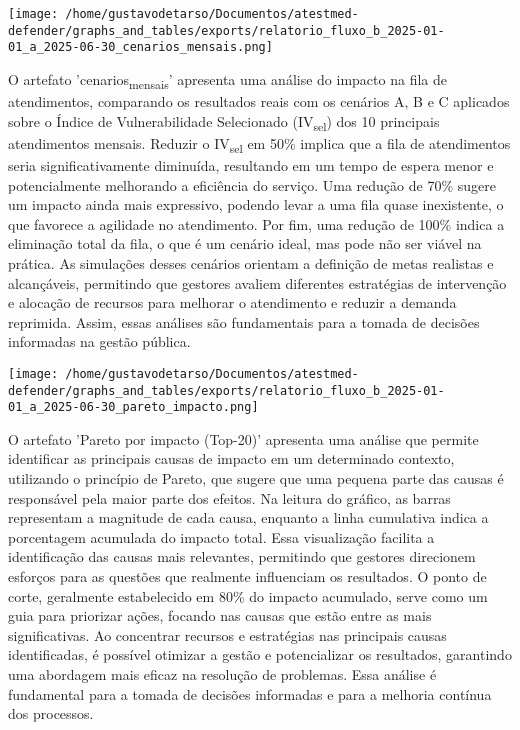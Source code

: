 \documentclass[11pt]{article}
\begin{document}
\begin{center}
\texttt{[image: /home/gustavodetarso/Documentos/atestmed-defender/graphs\_and\_tables/exports/relatorio\_fluxo\_b\_2025-01-01\_a\_2025-06-30\_cenarios\_mensais.png]}
\end{center}
O artefato 'cenarios\textsubscript{mensais}' apresenta uma análise do impacto na fila de atendimentos, comparando os resultados reais com os cenários A, B e C aplicados sobre o Índice de Vulnerabilidade Selecionado (IV\textsubscript{sel}) dos 10 principais atendimentos mensais. Reduzir o IV\textsubscript{sel} em 50\% implica que a fila de atendimentos seria significativamente diminuída, resultando em um tempo de espera menor e potencialmente melhorando a eficiência do serviço. Uma redução de 70\% sugere um impacto ainda mais expressivo, podendo levar a uma fila quase inexistente, o que favorece a agilidade no atendimento. Por fim, uma redução de 100\% indica a eliminação total da fila, o que é um cenário ideal, mas pode não ser viável na prática. As simulações desses cenários orientam a definição de metas realistas e alcançáveis, permitindo que gestores avaliem diferentes estratégias de intervenção e alocação de recursos para melhorar o atendimento e reduzir a demanda reprimida. Assim, essas análises são fundamentais para a tomada de decisões informadas na gestão pública.
\begin{center}
\texttt{[image: /home/gustavodetarso/Documentos/atestmed-defender/graphs\_and\_tables/exports/relatorio\_fluxo\_b\_2025-01-01\_a\_2025-06-30\_pareto\_impacto.png]}
\end{center}
O artefato 'Pareto por impacto (Top-20)' apresenta uma análise que permite identificar as principais causas de impacto em um determinado contexto, utilizando o princípio de Pareto, que sugere que uma pequena parte das causas é responsável pela maior parte dos efeitos. Na leitura do gráfico, as barras representam a magnitude de cada causa, enquanto a linha cumulativa indica a porcentagem acumulada do impacto total. Essa visualização facilita a identificação das causas mais relevantes, permitindo que gestores direcionem esforços para as questões que realmente influenciam os resultados. O ponto de corte, geralmente estabelecido em 80\% do impacto acumulado, serve como um guia para priorizar ações, focando nas causas que estão entre as mais significativas. Ao concentrar recursos e estratégias nas principais causas identificadas, é possível otimizar a gestão e potencializar os resultados, garantindo uma abordagem mais eficaz na resolução de problemas. Essa análise é fundamental para a tomada de decisões informadas e para a melhoria contínua dos processos.
\end{document}
